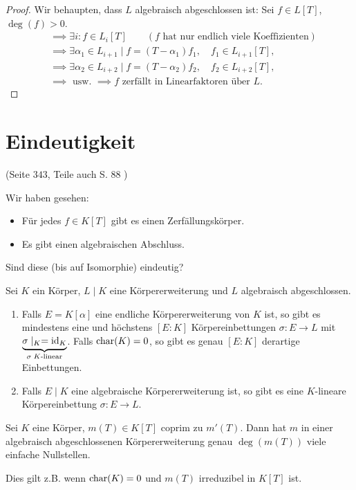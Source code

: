 \begin{proof}
		Wir behaupten, dass $L$ algebraisch abgeschlossen ist: Sei $f \in L[T]$, $\deg(f) > 0$.
		\begin{align*}
			&\implies \exists i : f \in L_{i}[T] \qquad (f \text{ hat nur endlich viele Koeffizienten})\\
			&\implies \exists \alpha_1 \in L_{i+1} \mid f = (T-\alpha_1) f_1, \quad f_1 \in L_{i+1}[T],\\
			&\implies \exists \alpha_2 \in L_{i+2} \mid f = (T-\alpha_2) f_2, \quad f_2 \in L_{i+2}[T],\\
			&\implies \text{ usw. } \implies f \text{ zerfällt in Linearfaktoren über } L.
		\end{align*}
\end{proof}

\section{Eindeutigkeit}
(Seite $343$, Teile auch S. $88$ )

Wir haben gesehen: 
\begin{itemize}
	\item Für jedes $f \in K[T]$ gibt es einen Zerfällungskörper.
	\item Es gibt einen algebraischen Abschluss.
\end{itemize}
Sind diese (bis auf Isomorphie) eindeutig?

\begin{theorem}
	Sei $K$ ein Körper, $L \mid K$ eine Körpererweiterung und $L$ algebraisch abgeschlossen.
	\begin{enumerate}
		\item Falls $E = K[\alpha]$ eine endliche Körpererweiterung von $K$ ist, so gibt es mindestens eine
			und höchstens $[E:K]$ Körpereinbettungen $\sigma: E \to L$ mit $\underbrace{\sigma \mid_{K} = \operatorname{id}_{K}}_{\sigma \; K\text{-linear}}$.
			Falls $\operatorname{char}(K)=0$, so gibt es genau $[E:K]$ derartige Einbettungen.
		\item Falls $E \mid K$ eine algebraische Körpererweiterung ist, so gibt es eine $K$-lineare Körpereinbettung
			$\sigma: E \to L$.
	\end{enumerate}
\end{theorem}

\begin{lemma}
	Sei $K$ eine Körper, $m(T) \in K[T]$ coprim zu $m'(T)$. Dann hat $m$ in einer algebraisch abgeschlossenen Körpererweiterung
	genau $\deg(m(T))$ viele einfache Nullstellen.

	Dies gilt z.B. wenn $\operatorname{char}(K) = 0$ und $m(T)$ irreduzibel in $K[T]$ ist.
\end{lemma}

